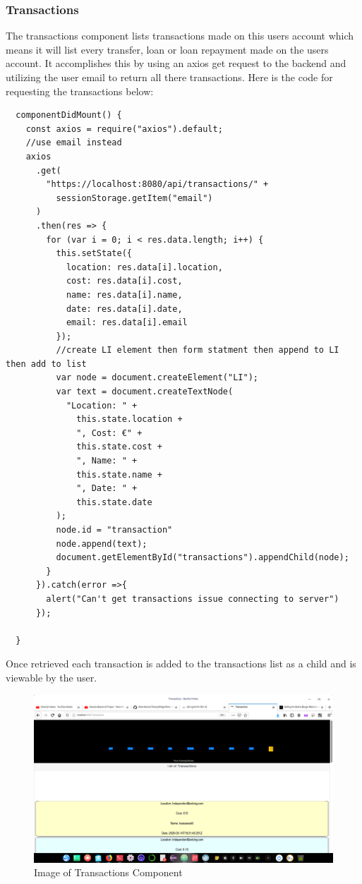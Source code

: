 \subsubsection{Transactions}
The transactions component lists transactions made on this users account which means it
will list every transfer, loan or loan repayment made on the users account.  It accomplishes
this by using an axios get request to the backend and utilizing the user email to return all
there transactions.  Here is the code for requesting the transactions below:
\begin{verbatim}
  componentDidMount() {
    const axios = require("axios").default;
    //use email instead
    axios
      .get(
        "https://localhost:8080/api/transactions/" +
          sessionStorage.getItem("email")
      )
      .then(res => {
        for (var i = 0; i < res.data.length; i++) {
          this.setState({
            location: res.data[i].location,
            cost: res.data[i].cost,
            name: res.data[i].name,
            date: res.data[i].date,
            email: res.data[i].email
          });
          //create LI element then form statment then append to LI then add to list
          var node = document.createElement("LI");
          var text = document.createTextNode(
            "Location: " +
              this.state.location +
              ", Cost: €" +
              this.state.cost +
              ", Name: " +
              this.state.name +
              ", Date: " +
              this.state.date
          );
          node.id = "transaction"
          node.append(text);
          document.getElementById("transactions").appendChild(node);
        }
      }).catch(error =>{
        alert("Can't get transactions issue connecting to server")
      });

  }
\end{verbatim}
Once retrieved each transaction is added to the transactions list as a child and is viewable by the user.
\begin{figure}[H]
\includegraphics[width=\textwidth]{img/transactionscomponent.png}
\caption{Image of Transactions Component}
\label{fig:Image of transactions component}
\end{figure}
